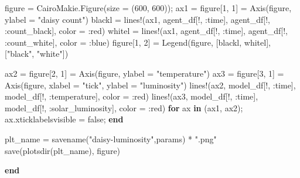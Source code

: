 \documentclass[
  english,
  russian,
  12pt,
  a4paper,
  DIV=11,
  numbers=noendperiod]{scrreprt}
\newenvironment{Shaded}{\begin{snugshade}}{\end{snugshade}}
\newcommand{\ConstantTok}[1]{\textcolor[rgb]{0.56,0.35,0.01}{#1}}
\newcommand{\ControlFlowTok}[1]{\textcolor[rgb]{0.00,0.23,0.31}{\textbf{#1}}}
\newcommand{\FloatTok}[1]{\textcolor[rgb]{0.68,0.00,0.00}{#1}}
\newcommand{\FunctionTok}[1]{\textcolor[rgb]{0.28,0.35,0.67}{#1}}
\newcommand{\KeywordTok}[1]{\textcolor[rgb]{0.00,0.23,0.31}{\textbf{#1}}}
\newcommand{\NormalTok}[1]{\textcolor[rgb]{0.00,0.23,0.31}{#1}}
\newcommand{\OperatorTok}[1]{\textcolor[rgb]{0.37,0.37,0.37}{#1}}
\newcommand{\StringTok}[1]{\textcolor[rgb]{0.13,0.47,0.30}{#1}}
\begin{document}
\begin{Shaded}
\begin{Highlighting}[]
\NormalTok{    figure }\OperatorTok{=}\NormalTok{ CairoMakie.}\FunctionTok{Figure}\NormalTok{(size }\OperatorTok{=}\NormalTok{ (}\FloatTok{600}\NormalTok{, }\FloatTok{600}\NormalTok{));}
\NormalTok{    ax1 }\OperatorTok{=}\NormalTok{ figure[}\FloatTok{1}\NormalTok{, }\FloatTok{1}\NormalTok{] }\OperatorTok{=} \FunctionTok{Axis}\NormalTok{(figure, ylabel }\OperatorTok{=} \StringTok{"daisy count"}\NormalTok{)}
\NormalTok{    blackl }\OperatorTok{=} \FunctionTok{lines!}\NormalTok{(ax1, agent\_df[!, }\OperatorTok{:}\NormalTok{time], agent\_df[!, }\OperatorTok{:}\NormalTok{count\_black], color }\OperatorTok{=} \OperatorTok{:}\NormalTok{red)}
\NormalTok{    whitel }\OperatorTok{=} \FunctionTok{lines!}\NormalTok{(ax1, agent\_df[!, }\OperatorTok{:}\NormalTok{time], agent\_df[!, }\OperatorTok{:}\NormalTok{count\_white], color }\OperatorTok{=} \OperatorTok{:}\NormalTok{blue)}
\NormalTok{    figure[}\FloatTok{1}\NormalTok{, }\FloatTok{2}\NormalTok{] }\OperatorTok{=} \FunctionTok{Legend}\NormalTok{(figure, [blackl, whitel], [}\StringTok{"black"}\NormalTok{, }\StringTok{"white"}\NormalTok{])}

\NormalTok{    ax2 }\OperatorTok{=}\NormalTok{ figure[}\FloatTok{2}\NormalTok{, }\FloatTok{1}\NormalTok{] }\OperatorTok{=} \FunctionTok{Axis}\NormalTok{(figure, ylabel }\OperatorTok{=} \StringTok{"temperature"}\NormalTok{)}
\NormalTok{    ax3 }\OperatorTok{=}\NormalTok{ figure[}\FloatTok{3}\NormalTok{, }\FloatTok{1}\NormalTok{] }\OperatorTok{=} \FunctionTok{Axis}\NormalTok{(figure, xlabel }\OperatorTok{=} \StringTok{"tick"}\NormalTok{, ylabel }\OperatorTok{=} \StringTok{"luminosity"}\NormalTok{)}
    \FunctionTok{lines!}\NormalTok{(ax2, model\_df[!, }\OperatorTok{:}\NormalTok{time], model\_df[!, }\OperatorTok{:}\NormalTok{temperature], color }\OperatorTok{=} \OperatorTok{:}\NormalTok{red)}
    \FunctionTok{lines!}\NormalTok{(ax3, model\_df[!, }\OperatorTok{:}\NormalTok{time], model\_df[!, }\OperatorTok{:}\NormalTok{solar\_luminosity], color }\OperatorTok{=} \OperatorTok{:}\NormalTok{red)}
    \ControlFlowTok{for}\NormalTok{ ax }\KeywordTok{in}\NormalTok{ (ax1, ax2); ax.xticklabelsvisible }\OperatorTok{=} \ConstantTok{false}\NormalTok{; }\ControlFlowTok{end}


\NormalTok{    plt\_name }\OperatorTok{=} \FunctionTok{savename}\NormalTok{(}\StringTok{"daisy{-}luminosity"}\NormalTok{,params) }\OperatorTok{*} \StringTok{".png"}
    \FunctionTok{save}\NormalTok{(}\FunctionTok{plotsdir}\NormalTok{(plt\_name), figure)}

\ControlFlowTok{end}
\end{Highlighting}
\end{Shaded}
\end{document}
